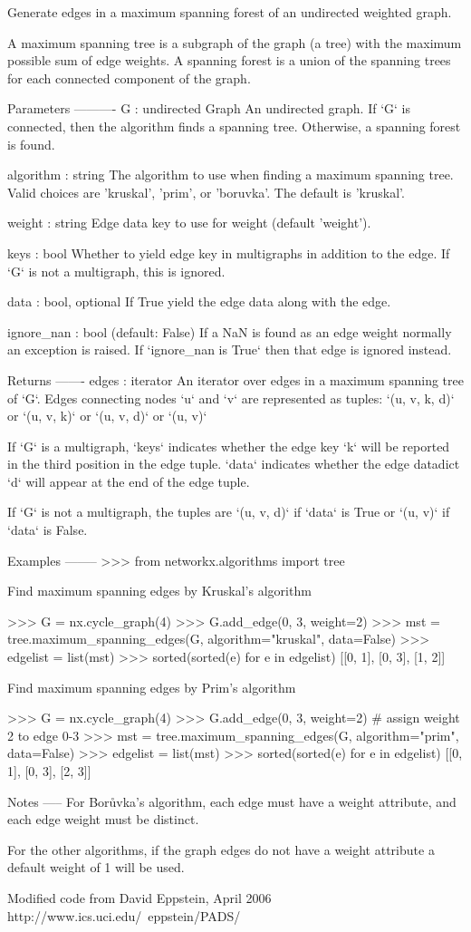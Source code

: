\begin{DoxyVerb}Generate edges in a maximum spanning forest of an undirected
weighted graph.

A maximum spanning tree is a subgraph of the graph (a tree)
with the maximum possible sum of edge weights.  A spanning forest is a
union of the spanning trees for each connected component of the graph.

Parameters
----------
G : undirected Graph
   An undirected graph. If `G` is connected, then the algorithm finds a
   spanning tree. Otherwise, a spanning forest is found.

algorithm : string
   The algorithm to use when finding a maximum spanning tree. Valid
   choices are 'kruskal', 'prim', or 'boruvka'. The default is 'kruskal'.

weight : string
   Edge data key to use for weight (default 'weight').

keys : bool
   Whether to yield edge key in multigraphs in addition to the edge.
   If `G` is not a multigraph, this is ignored.

data : bool, optional
   If True yield the edge data along with the edge.

ignore_nan : bool (default: False)
    If a NaN is found as an edge weight normally an exception is raised.
    If `ignore_nan is True` then that edge is ignored instead.

Returns
-------
edges : iterator
   An iterator over edges in a maximum spanning tree of `G`.
   Edges connecting nodes `u` and `v` are represented as tuples:
   `(u, v, k, d)` or `(u, v, k)` or `(u, v, d)` or `(u, v)`

   If `G` is a multigraph, `keys` indicates whether the edge key `k` will
   be reported in the third position in the edge tuple. `data` indicates
   whether the edge datadict `d` will appear at the end of the edge tuple.

   If `G` is not a multigraph, the tuples are `(u, v, d)` if `data` is True
   or `(u, v)` if `data` is False.

Examples
--------
>>> from networkx.algorithms import tree

Find maximum spanning edges by Kruskal's algorithm

>>> G = nx.cycle_graph(4)
>>> G.add_edge(0, 3, weight=2)
>>> mst = tree.maximum_spanning_edges(G, algorithm="kruskal", data=False)
>>> edgelist = list(mst)
>>> sorted(sorted(e) for e in edgelist)
[[0, 1], [0, 3], [1, 2]]

Find maximum spanning edges by Prim's algorithm

>>> G = nx.cycle_graph(4)
>>> G.add_edge(0, 3, weight=2)  # assign weight 2 to edge 0-3
>>> mst = tree.maximum_spanning_edges(G, algorithm="prim", data=False)
>>> edgelist = list(mst)
>>> sorted(sorted(e) for e in edgelist)
[[0, 1], [0, 3], [2, 3]]

Notes
-----
For Borůvka's algorithm, each edge must have a weight attribute, and
each edge weight must be distinct.

For the other algorithms, if the graph edges do not have a weight
attribute a default weight of 1 will be used.

Modified code from David Eppstein, April 2006
http://www.ics.uci.edu/~eppstein/PADS/
\end{DoxyVerb}
